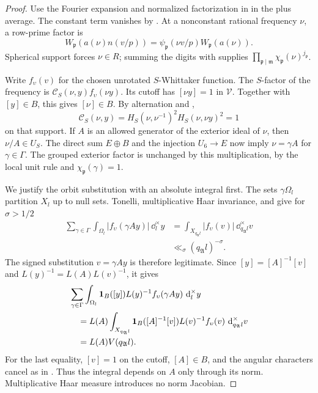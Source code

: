 \begin{proof}
Use the Fourier expansion and normalized factorization in
 in the
plus average.  The constant term vanishes by
.  At a nonconstant rational
frequency \(\nu\), a row-prime factor is
\[
 W_{\mathfrak p}(a(\nu)n(v/p))
   =\psi_{\mathfrak p}(\nu v/p)W_{\mathfrak p}(a(\nu)).
\]
Spherical support forces \(\nu\in R\); summing the digits with
 supplies
\(\prod_{\mathfrak p\mid\mathfrak m}\chi_{\mathfrak p}(\nu)^{j_{\mathfrak p}}\).

Write \(f_\upsilon(v)\) for the chosen unrotated \(S\)-Whittaker function.
The \(S\)-factor of the frequency is
\(\mathcal C_S(\nu,y)f_\upsilon(\nu y)\).  Its cutoff has
\([\nu y]=1\) in \(\mathcal V\).  Together with \([y]\in B\), this gives
\([\nu]\in B\).  By alternation and ,
\[
 \mathcal C_S(\nu,y)
   =H_S(\nu,\nu^{-1})^2H_S(\nu,\nu y)^2=1
\]
on that support.  If \(A\) is an allowed generator of the exterior ideal
of \(\nu\), then \(\nu/A\in U_S\).  The direct sum \(E\oplus B\) and the
injection \(U_6\longrightarrow E\) now imply \(\nu=\gamma A\) for
\(\gamma\in\Gamma\).  The grouped exterior factor is unchanged by this
multiplication, by the local unit rule and
\(\chi_{\mathfrak p}(\gamma)=1\).

We justify the orbit substitution with an absolute integral first.
The sets \(\gamma\Omega_l\) partition \(X_l\) up to null sets.  Tonelli,
multiplicative Haar invariance, and  give
for \(\sigma>1/2\)
\begin{equation}\label{eq:reflection-forward-absolute}
\begin{split}
 \sum_{\gamma\in\Gamma}\int_{\Omega_l}
       |f_\upsilon(\gamma Ay)|\,\dd_l^\times y
  &=\int_{X_{q_{\mathfrak A}l}}|f_\upsilon(v)|\,
                      \dd_{q_{\mathfrak A}l}^\times v\\
  &\ll_\sigma(q_{\mathfrak A}l)^{-\sigma}.
\end{split}
\end{equation}
The signed substitution \(v=\gamma Ay\) is therefore legitimate.  Since
\([y]=[A]^{-1}[v]\) and \(L(y)^{-1}=L(A)L(v)^{-1}\), it gives
\begin{equation}\label{eq:reflection-forward-unfolding}
\begin{split}
 &\sum_{\gamma\in\Gamma}\int_{\Omega_l}
       \mathbf{1}_B([y])L(y)^{-1}f_\upsilon(\gamma Ay)\,\,\mathrm{d}_l^\times y\\
 &\quad=L(A)\int_{X_{q_{\mathfrak A}l}}
       \mathbf{1}_B([A]^{-1}[v])L(v)^{-1}f_\upsilon(v)\,
                    \,\mathrm{d}_{q_{\mathfrak A}l}^\times v\\
 &\quad=L(A)V(q_{\mathfrak A}l).
\end{split}
\end{equation}
For the last equality, \([v]=1\) on the cutoff, \([A]\in B\), and the
angular characters cancel as in .  Thus the
integral depends on \(A\) only through its norm.  Multiplicative Haar
measure introduces no norm Jacobian.


\end{proof}
